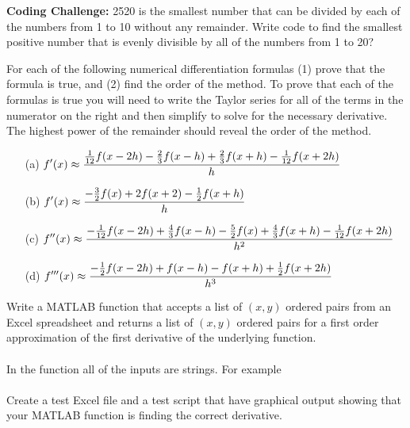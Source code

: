 \begin{problem}
    {\bf Coding Challenge:} 2520 is the smallest number that can be divided by each of the
    numbers from 1 to 10 without any remainder.  Write code to find the smallest positive
    number that is evenly divisible by all of the numbers from 1 to 20?
\end{problem}

\begin{problem}
    For each of the following numerical differentiation formulas (1) prove that the
    formula is true, and (2) find the order of the method. To prove that each of the
    formulas is true you will need to write the Taylor series for all of the terms in the
    numerator on the right and then simplify to solve for the necessary derivative.  The
    highest power of the remainder should reveal the order of the method.
    \begin{enumerate}
        \item[(a)] $\displaystyle f'(x) \approx \frac{\frac{1}{12} f(x-2h) - \frac{2}{3} f(x-h) +
            \frac{2}{3} f(x+h) - \frac{1}{12} f(x+2h)}{h}$
        \item[(b)] $\displaystyle f'(x) \approx \frac{-\frac{3}{2} f(x) + 2 f(x+2) -
            \frac{1}{2} f(x+h)}{h}$
        \item[(c)] $\displaystyle f''(x) \approx \frac{-\frac{1}{12} f(x-2h) + \frac{4}{3} f(x-h) -
            \frac{5}{2} f(x) + \frac{4}{3} f(x+h) - \frac{1}{12} f(x+2h)}{h^2}$
        \item[(d)] $\displaystyle f'''(x) \approx \frac{-\frac{1}{2} f(x-2h) + f(x-h) - f(x+h) +
            \frac{1}{2} f(x+2h)}{h^3}$
    \end{enumerate}
\end{problem}

\begin{problem}\label{prob:first_deriv_data}
    Write a MATLAB function that accepts a list of $(x,y)$ ordered pairs from an Excel
    spreadsheet and returns a list of $(x,y)$ ordered pairs for a first order
    approximation of the first derivative of the
    underlying function. \\
     \\
    In the function all of the inputs are strings.  For example \\
    \\
    Create a test Excel file and a test script that have graphical output showing that
    your MATLAB function is finding the correct derivative.
\end{problem}




